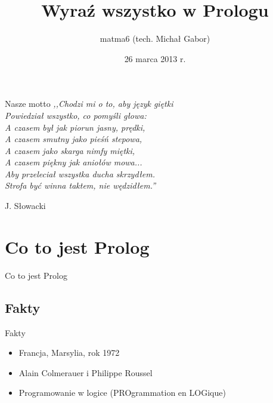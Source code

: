\documentclass[blue]{beamer}
\author{matma6 (tech. Michał Gabor)}
\title{Wyraź wszystko w Prologu}
\date{26 marca 2013 r.}
\newcommand{\tytul}[1]{\begin{frame}\begin{center}\begin{Huge}#1\end{Huge}\end{center}\end{frame}}
\begin{document}
\begin{frame}
\titlepage
\end{frame}
\begin{frame}{Nasze motto}
\textit{,,Chodzi mi o to, aby język giętki\\Powiedział wszystko, co pomyśli głowa:\\A czasem był jak piorun jasny, prędki,\\A czasem smutny jako pieśń stepowa,\\A czasem jako skarga nimfy miętki,\\A czasem piękny jak aniołów mowa...\\Aby przeleciał wszystka ducha skrzydłem.\\Strofa być winna taktem, nie wędzidłem.''}
\begin{flushright}
J. Słowacki
\end{flushright}
\end{frame}
\begin{frame}
\begin{small}
\tableofcontents
\end{small}
\end{frame}
\section{Co to jest Prolog}
\tytul{Co to jest Prolog}
\subsection{Fakty}
\begin{frame}{Fakty}
\begin{itemize}
\item Francja, Marsylia, rok 1972
\item Alain Colmerauer i Philippe Roussel
\item Programowanie w logice (PROgrammation en LOGique)
\end{itemize}
\end{frame}
\end{document}

